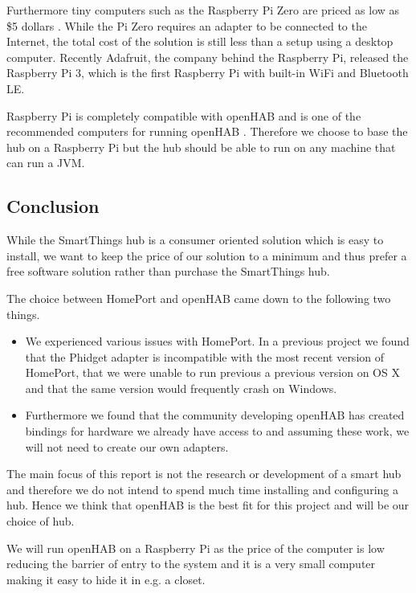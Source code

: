 Furthermore tiny computers such as the Raspberry Pi Zero are priced as low as \$5 dollars \cite{raspberrypi:zero}. While the Pi Zero requires an adapter to be connected to the Internet, the total cost of the solution is still less than a setup using a desktop computer. Recently Adafruit, the company behind the Raspberry Pi, released the Raspberry Pi 3, which is the first Raspberry Pi with built-in WiFi and Bluetooth LE.

Raspberry Pi is completely compatible with openHAB and is one of the recommended computers for running openHAB \cite{openhab:hardware}. Therefore we choose to base the hub on a Raspberry Pi but the hub should be able to run on any machine that can run a JVM.

\subsection{Conclusion}
\label{sec:analysis:choice-of-hub:conclusion}

While the SmartThings hub is a consumer oriented solution which is easy to install, we want to keep the price of our solution to a minimum and thus prefer a free software solution rather than purchase the SmartThings hub.

The choice between HomePort and openHAB came down to the following two things.

\begin{itemize}
\item We experienced various issues with HomePort. In a previous project \cite{prespecialisation} we found that the Phidget adapter is incompatible with the most recent version of HomePort, that we were unable to run previous a previous version on OS X and that the same version would frequently crash on Windows.
\item Furthermore we found that the community developing openHAB has created bindings for hardware we already have access to and assuming these work, we will not need to create our own adapters.
\end{itemize}

The main focus of this report is not the research or development of a smart hub and therefore we do not intend to spend much time installing and configuring a hub. Hence we think that openHAB is the best fit for this project and will be our choice of hub.

We will run openHAB on a Raspberry Pi as the price of the computer is low reducing the barrier of entry to the system and it is a very small computer making it easy to hide it in e.g. a closet.

